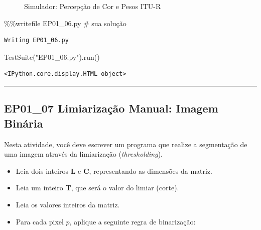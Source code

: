 \documentclass[
  portuguese,
  letterpaper,
  openany,
  oneside,
  12pt,
  a4paper]{book}
\newenvironment{Shaded}{\begin{snugshade}}{\end{snugshade}}
\newcommand{\CommentTok}[1]{\textcolor[rgb]{0.37,0.37,0.37}{#1}}
\newcommand{\NormalTok}[1]{\textcolor[rgb]{0.00,0.23,0.31}{#1}}
\newcommand{\OperatorTok}[1]{\textcolor[rgb]{0.37,0.37,0.37}{#1}}
\newcommand{\StringTok}[1]{\textcolor[rgb]{0.13,0.47,0.30}{#1}}
\providecommand{\tightlist}{%
  \setlength{\itemsep}{0pt}\setlength{\parskip}{0pt}}
\begin{document}
\begin{figure}


\caption{\label{fig-01-rgb-gray}Simulador: Percepção de Cor e Pesos
ITU-R}

\end{figure}%

\begin{Shaded}
\begin{Highlighting}[]
\OperatorTok{\%\%}\NormalTok{writefile EP01\_06.py}
\CommentTok{\# sua solução}
\end{Highlighting}
\end{Shaded}

\begin{verbatim}
Writing EP01_06.py
\end{verbatim}

\begin{Shaded}
\begin{Highlighting}[]
\NormalTok{TestSuite(}\StringTok{"EP01\_06.py"}\NormalTok{).run()}
\end{Highlighting}
\end{Shaded}

\begin{verbatim}
<IPython.core.display.HTML object>
\end{verbatim}

\begin{center}\rule{0.5\linewidth}{0.5pt}\end{center}

\subsection{\texorpdfstring{EP01\_07  Limiarização
Manual: Imagem
Binária}{EP01\_07  Limiarização Manual: Imagem Binária}}\label{ep01_07-limiarizauxe7uxe3o-manual-imagem-binuxe1ria}

Nesta atividade, você deve escrever um programa que realize a
segmentação de uma imagem através da limiarização (\emph{thresholding}).

\begin{itemize}
\tightlist
\item
  Leia dois inteiros \textbf{L} e \textbf{C}, representando as dimensões
  da matriz.
\item
  Leia um inteiro \textbf{T}, que será o valor do limiar (corte).
\item
  Leia os valores inteiros da matriz.
\item
  Para cada pixel \(p\), aplique a seguinte regra de binarização:
\end{itemize}
\end{document}
